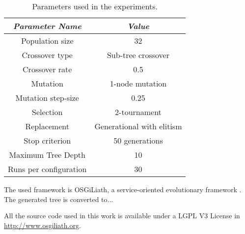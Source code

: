 \documentclass[a4paper,10pt,twocolumn,preprint,3p]{elsarticle}
\begin{document}
\begin{table}
\begin{center}
\begin{tabular}{|c|c|}
\hline
{\em Parameter Name} & {\em Value} \\\hline
Population size & 32 \\\hline
Crossover type & Sub-tree crossover \\ \hline
Crossover rate & 0.5\\ \hline
Mutation  & 1-node mutation\\ \hline
Mutation step-size & 0.25 \\ \hline
Selection & 2-tournament \\ \hline
Replacement & Generational with elitism\\ \hline
Stop criterion & 50 generations \\ \hline
Maximum Tree Depth & 10 \\ \hline %
Runs per configuration & 30 \\ \hline
\end{tabular}
\caption{Parameters used in the experiments.}
\label{tab:parameters}
\end{center}
\end{table}

The used framework is OSGiLiath, a service-oriented evolutionary
framework \cite{DBLP:journals/soco/Garcia-SanchezGCAG13}. The
generated tree is converted to...

All the source code used in this
work is available under a LGPL V3 License in
\url{http://www.osgiliath.org}. 




\end{document}

